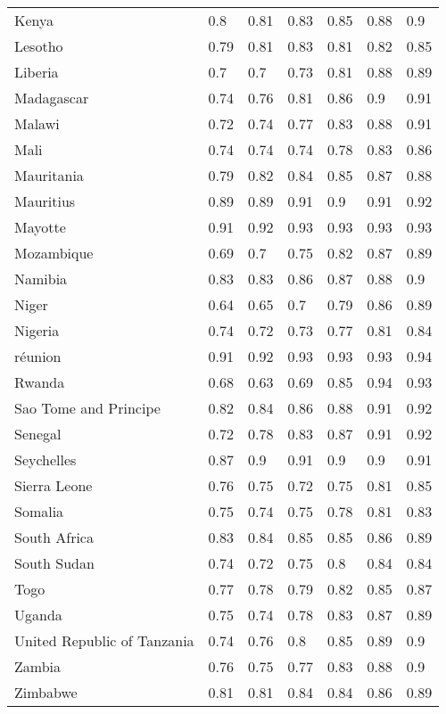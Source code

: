 \begin{longtable}[t]{lllllll}
Kenya & 0.8 & 0.81 & 0.83 & 0.85 & 0.88 & 0.9\\
Lesotho & 0.79 & 0.81 & 0.83 & 0.81 & 0.82 & 0.85\\
Liberia & 0.7 & 0.7 & 0.73 & 0.81 & 0.88 & 0.89\\
Madagascar & 0.74 & 0.76 & 0.81 & 0.86 & 0.9 & 0.91\\
Malawi & 0.72 & 0.74 & 0.77 & 0.83 & 0.88 & 0.91\\
Mali & 0.74 & 0.74 & 0.74 & 0.78 & 0.83 & 0.86\\
Mauritania & 0.79 & 0.82 & 0.84 & 0.85 & 0.87 & 0.88\\
Mauritius & 0.89 & 0.89 & 0.91 & 0.9 & 0.91 & 0.92\\
Mayotte & 0.91 & 0.92 & 0.93 & 0.93 & 0.93 & 0.93\\
Mozambique & 0.69 & 0.7 & 0.75 & 0.82 & 0.87 & 0.89\\
Namibia & 0.83 & 0.83 & 0.86 & 0.87 & 0.88 & 0.9\\
Niger & 0.64 & 0.65 & 0.7 & 0.79 & 0.86 & 0.89\\
Nigeria & 0.74 & 0.72 & 0.73 & 0.77 & 0.81 & 0.84\\
réunion & 0.91 & 0.92 & 0.93 & 0.93 & 0.93 & 0.94\\
Rwanda & 0.68 & 0.63 & 0.69 & 0.85 & 0.94 & 0.93\\
Sao Tome and Principe & 0.82 & 0.84 & 0.86 & 0.88 & 0.91 & 0.92\\
Senegal & 0.72 & 0.78 & 0.83 & 0.87 & 0.91 & 0.92\\
Seychelles & 0.87 & 0.9 & 0.91 & 0.9 & 0.9 & 0.91\\
Sierra Leone & 0.76 & 0.75 & 0.72 & 0.75 & 0.81 & 0.85\\
Somalia & 0.75 & 0.74 & 0.75 & 0.78 & 0.81 & 0.83\\
South Africa & 0.83 & 0.84 & 0.85 & 0.85 & 0.86 & 0.89\\
South Sudan & 0.74 & 0.72 & 0.75 & 0.8 & 0.84 & 0.84\\
Togo & 0.77 & 0.78 & 0.79 & 0.82 & 0.85 & 0.87\\
Uganda & 0.75 & 0.74 & 0.78 & 0.83 & 0.87 & 0.89\\
United Republic of Tanzania & 0.74 & 0.76 & 0.8 & 0.85 & 0.89 & 0.9\\
Zambia & 0.76 & 0.75 & 0.77 & 0.83 & 0.88 & 0.9\\
Zimbabwe & 0.81 & 0.81 & 0.84 & 0.84 & 0.86 & 0.89\\*
\end{longtable}
\endgroup{}
